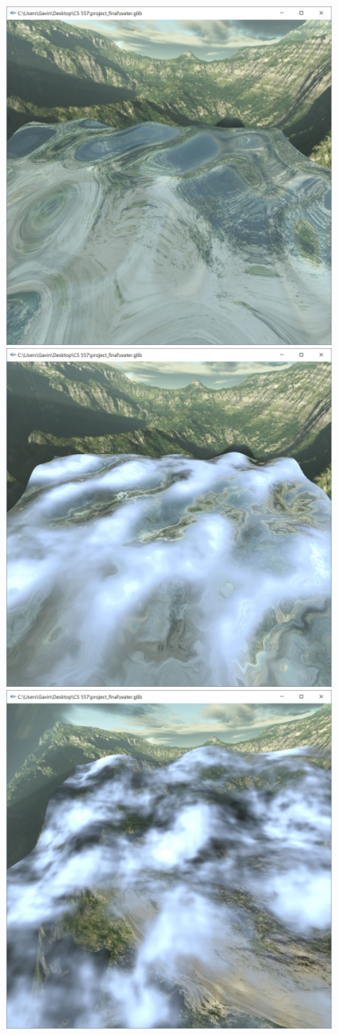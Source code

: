 \documentclass[letterpaper,14pt,titlepage,fleqn]{article}
\begin{document}
 \begin{center}
 	\includegraphics[width=4.25in]{final1.jpg}
 	\includegraphics[width=4.25in]{final2.jpg}
 	\includegraphics[width=4.25in]{final3.jpg}
 \end{center}
\end{document}
